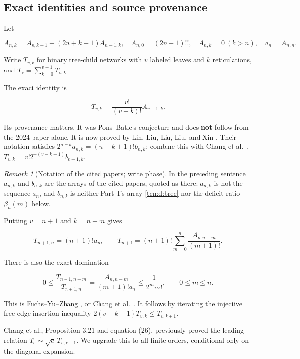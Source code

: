 \documentclass[11pt,letterpaper]{article}
\theoremstyle{remark}
\newtheorem{remark}[theorem]{Remark}
\begin{document}
\subsection{Exact identities and source
provenance}\label{tcn:b:exact-identities-and-source-provenance}

Let

\[
 A_{n,k}=A_{n,k-1}+(2n+k-1)A_{n-1,k},\quad
 A_{n,0}=(2n-1)!!,\quad A_{n,k}=0\ (k>n),\quad a_n=A_{n,n}.
\]

Write \(T_{v,k}\) for binary tree-child networks with \(v\) labeled
leaves and \(k\) reticulations, and \(T_v=\sum_{k=0}^{v-1}T_{v,k}\).

The exact identity is

\[
 T_{v,k}=\frac{v!}{(v-k)!}A_{v-1,k}.                 \tag{T1}\label{tcn:b:T1}
\]

Its provenance matters. It was Pons--Batle's conjecture and does
\textbf{not} follow from the 2024 paper alone. It is now proved by Lin,
Liu, Liu, Liu, and Xin \cite[Theorem 1.1 and the displayed proof following Conjecture 1.3]{LL2026}. Their
notation satisfies \(2^{n-k}a_{n,k}=(n-k+1)!b_{n,k}\); combine this with
Chang et al.\ \cite[Theorem 3.4]{Chang2024}, \(T_{v,k}=v!2^{-(v-k-1)}b_{v-1,k}\).

\begin{remark}[Notation of the cited papers; write phase]\label{tcn:b:rem:lin}
In the preceding sentence $a_{n,k}$ and $b_{n,k}$ are the arrays of the cited papers, quoted as there: $a_{n,k}$ is not the sequence $a_n$, and $b_{n,k}$ is neither Part~I's array \eqref{tcn:d:brec} nor the deficit ratio $\beta_n(m)$ below.
\end{remark}

Putting \(v=n+1\) and \(k=n-m\) gives

\[
 T_{n+1,n}=(n+1)!a_n,\qquad
 T_{n+1}=(n+1)!\sum_{m=0}^n\frac{A_{n,n-m}}{(m+1)!}.       \tag{T2}\label{tcn:b:T2}
\]

There is also the exact domination

\[
 0\le\frac{T_{n+1,n-m}}{T_{n+1,n}}
 =\frac{A_{n,n-m}}{(m+1)!a_n}
 \le\frac{1}{2^m m!},\qquad 0\le m\le n.                \tag{T3}\label{tcn:b:T3}
\]

This is Fuchs--Yu--Zhang \cite[equation~(4), p.~5 of the PDF]{FYZ2021}, or Chang et al.\ \cite[Lemma 3.8, equation (16)]{Chang2024}. It
follows by iterating the injective free-edge insertion inequality
\(2(v-k-1)T_{v,k}\le T_{v,k+1}\).

Chang et al., Proposition 3.21 and equation (26), previously proved the
leading relation \(T_v\sim\sqrt e\,T_{v,v-1}\). We upgrade this to all
finite orders, conditional only on the diagonal expansion.
\end{document}
